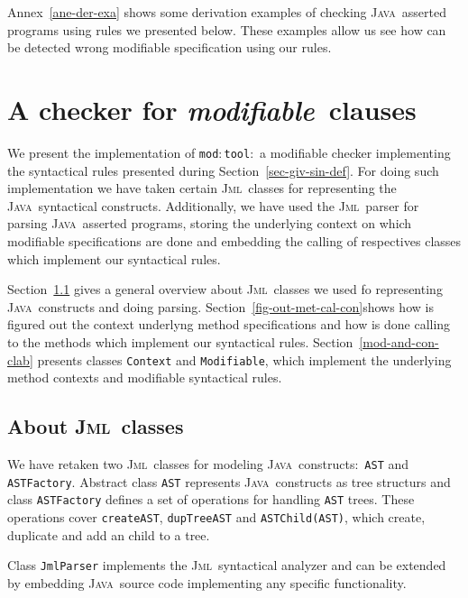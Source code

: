 \documentclass[a4paper]{llncs}
\newcommand{\jml}{\textsc{Jml}}
\newcommand{\java}{\textsc{Java}}
\newcommand{\modtool}{\texttt{mod$:$tool}}
\newcommand{\modif}{\textit{modifiable}}
\begin{document}
Annex~\ref{ane-der-exa} shows some derivation examples of checking \java~asserted programs using rules we presented below. These examples allow us see how can be detected wrong modifiable specification using our rules. 






\section{A checker for \modif~clauses}
\label{sec-imp-iss}
We present the implementation of \modtool$:$ a modifiable checker implementing the syntactical rules presented during Section~\ref{sec-giv-sin-def}. For doing such implementation we have taken certain \jml~classes for representing the \java~syntactical constructs. Additionally, we have used the \jml~parser for parsing \java~asserted programs, storing the underlying context on which modifiable specifications are done and embedding the calling of respectives classes which implement our syntactical rules. 

Section~\ref{abo-jml-cla-use} gives a general overview about \jml~classes we used fo representing \java~constructs and doing parsing. Section~\ref{fig-out-met-cal-con}shows how is figured out the context underlyng method specifications and how is done calling to the methods which implement our syntactical rules. Section~\ref{mod-and-con-clab} presents classes \texttt{Context} and \texttt{Modifiable}, which implement the underlying method contexts and modifiable syntactical rules.




\subsection{About \jml~classes}
\label{abo-jml-cla-use}
We have retaken two \jml~classes for modeling \java~constructs$:$ \texttt{AST} and \texttt{ASTFactory}. Abstract class \texttt{AST} represents \java~constructs as tree structurs and class \texttt{ASTFactory} defines a set of operations for handling \texttt{AST} trees. These operations cover \texttt{create{AST}}, \texttt{dupTree{AST}} and \texttt{ASTChild(AST)}, which create, duplicate and add an child to a tree.

Class \texttt{JmlParser} implements the \jml~syntactical analyzer and can be extended by embedding \java~source code implementing any specific functionality. 
\end{document}
